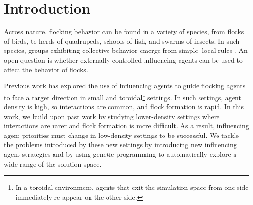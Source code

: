 \chapter{Introduction}
\label{ch:introduction}

%


Across nature, flocking behavior can be found in a variety of species, from
flocks of birds, to herds of quadrupeds, schools of fish, and swarms of insects.
In such species, groups exhibiting collective behavior emerge from simple, 
local rules \citep{sumpter2010collective}.
An open question is whether externally-controlled influencing agents can be 
used to affect the behavior of flocks.

Previous work \cite{genter2013backsearch, genter2013visionstationary, 
genter2014neighborsorientherd, genter2015placement, genter2016facegoalfacecurrent, 
genter201612steplookahead, genterthesis}
has explored the use of influencing agents to guide flocking 
agents to face a target direction in small and toroidal\footnote{In a toroidal
environment, agents that exit the simulation space from one side immediately
re-appear on the other side.} settings.
In such settings, agent density is high, so interactions are common, and flock
formation is rapid.
In this work, we build upon past work by studying lower-density settings where
interactions are rarer and flock formation is more difficult.
As a result, influencing agent priorities must change in low-density settings
to be successful.
We tackle the problems introduced by these new settings by introducing new
influencing agent strategies and by using genetic programming to automatically
explore a wide range of the solution space.

